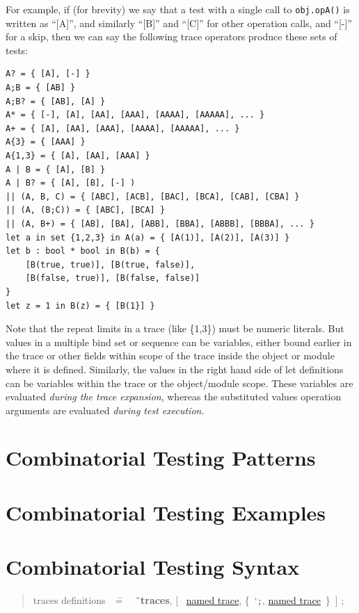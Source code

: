 \documentclass{overturerepchap}
\newcommand{\Lit}[1]{`{\tt #1}\Quote}
\newcommand{\Rule}[2]{
  \begin{quote}\begin{tabbing}
    #1\index{#1}\ \ \= = \ \ \= #2  ; %

  \end{tabbing}\end{quote}
  }
\newcommand{\RuleTarget}[1]{\hypertarget{rule:#1}{}}
\newcommand{\Ruledef}[2]
{
  \RuleTarget{#1}\Rule{#1}{#2}%
  }
\newcommand{\Ruleref}[1]{
  \hyperlink{rule:#1}{#1}}
\newcommand{\SeqPt}[1]{\{\ #1\ \}}
\newcommand{\Lop}[1]{`{\bf\ttfamily #1}\Quote}
\newcommand{\OptPt}[1]{[\ #1\ ]}
\begin{document}
For example, if (for brevity) we say that a test with a single call to
\texttt{obj.opA()} is written as ``[A]'', and similarly ``[B]'' and ``[C]'' 
for other operation calls, and ``[-]'' for a skip, then we can say the 
following trace operators produce these sets of tests:

\small
\begin{verbatim}
A? = { [A], [-] }
A;B = { [AB] }
A;B? = { [AB], [A] }
A* = { [-], [A], [AA], [AAA], [AAAA], [AAAAA], ... }
A+ = { [A], [AA], [AAA], [AAAA], [AAAAA], ... }
A{3} = { [AAA] }
A{1,3} = { [A], [AA], [AAA] }
A | B = { [A], [B] }
A | B? = { [A], [B], [-] )
|| (A, B, C) = { [ABC], [ACB], [BAC], [BCA], [CAB], [CBA] }
|| (A, (B;C)) = { [ABC], [BCA] }
|| (A, B+) = { [AB], [BA], [ABB], [BBA], [ABBB], [BBBA], ... }
let a in set {1,2,3} in A(a) = { [A(1)], [A(2)], [A(3)] }
let b : bool * bool in B(b) = {
    [B(true, true)], [B(true, false)],
    [B(false, true)], [B(false, false)]
}
let z = 1 in B(z) = { [B(1}] }
\end{verbatim}
\normalsize

Note that the repeat limits in a trace (like \{1,3\}) must be numeric literals.
But values in a multiple bind set or sequence can be variables, either bound
earlier in the trace or other fields within scope of the trace inside the object
or module where it is defined. Similarly, the values in the right hand side of
let definitions can be variables within the trace or the object/module scope.
These variables are evaluated \emph{during the trace expansion}, whereas the
substituted values operation arguments are evaluated \emph{during test
execution}.


\chapter{Combinatorial Testing Patterns}
\label{chap:patterns}

\chapter{Combinatorial Testing Examples}
\label{chap:examples}

\appendix
\chapter{Combinatorial Testing Syntax}
\label{chap:CTsyntax}

\Ruledef{traces definitions}{\Lop{traces},
   \OptPt{\Ruleref{named trace}, \SeqPt{\Lit{;}, \Ruleref{named trace}}}
}
\end{document}
